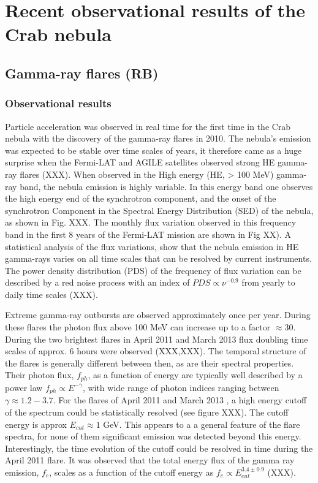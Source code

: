 \section{Recent observational results of the Crab nebula}
\subsection{Gamma-ray flares (RB)}
\subsubsection{Observational results}

Particle acceleration was observed in real time for the first time in the Crab nebula with the discovery of the gamma-ray flares in 2010.  The nebula's emission was expected to  be stable over time scales of years, it therefore came as a huge surprise when the Fermi-LAT and AGILE satellites observed strong HE gamma-ray flares (XXX). When observed in the High energy (HE, > 100 MeV) gamma-ray band, the nebula emission is highly variable. In this energy band one observes the high energy end of the synchrotron component, and the onset of the synchrotron Component in the Spectral Energy Distribution (SED) of the nebula, as shown in Fig. XXX. The monthly flux variation observed in this frequency band in the first 8 years of the Fermi-LAT mission are shown in Fig XX). A statistical analysis of the flux variations, show that the nebula emission in HE gamma-rays varies on all time scales that can be resolved by current instruments. The power density distribution (PDS) of the frequency of flux variation can be described by a red noise process with an index of $PDS \propto \nu^{-0.9}$  from yearly to daily time scales (XXX).

Extreme gamma-ray outbursts are observed approximately once per year. During these flares the photon flux above 100 MeV can increase up to a factor $\approx 30$. During the two brightest flares in April 2011 and March 2013 flux doubling time scales of approx. 6 hours were observed (XXX,XXX). The temporal structure of the flares is generally different between then, as are their spectral properties. Their photon flux, $f_{ph}$,  as a function of energy are typically well described by a power law $f_{ph} \propto E^{-\gamma}$, with  wide range of photon indices ranging between  $\gamma \approx 1.2 - 3.7$. For the flares of April 2011 and March 2013 , a high energy cutoff of the spectrum could be statistically resolved (see figure XXX). The cutoff energy is approx $E_{cut} \approx 1$ GeV. This appears to a a general feature of the flare spectra, for none of them significant emission was detected beyond this energy. Interestingly, the time evolution of the cutoff could be resolved in time during the April 2011 flare. It was observed that the total energy flux of the gamma ray emission, $f_e$,  scales as a function of the cutoff energy as $f_e \propto E_{cut}^{3.4 \pm 0.9}$ (XXX).

